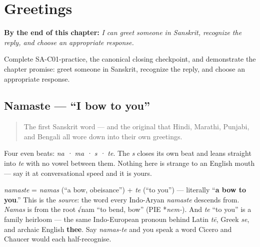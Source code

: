 
\chapter{Greetings}
\label{ch:greetings}

\begin{chapteropening}
\textbf{By the end of this chapter:} \emph{I can greet someone in Sanskrit, recognize the reply, and choose an appropriate response.}

Complete SA-C01-practice, the canonical closing checkpoint, and demonstrate the chapter promise: greet someone in Sanskrit, recognize the reply, and choose an appropriate response.
\end{chapteropening}

\section[\texorpdfstring{\sk{नमस्ते} (namaste)}{नमस्ते (namaste)}]{Namaste — \textquotedblleft{}I bow to you\textquotedblright{}}

\label{lesson:SA-C01-namaste}



\begin{quote}
The first Sanskrit word — and the original that Hindi, Marathi, Punjabi, and Bengali all wore down into their own greetings.
\end{quote}

\begin{sounds}
Four even beats: \emph{na · ma · s · te}. The \emph{s} closes its own beat and leans straight into \emph{te} with no vowel between them. Nothing here is strange to an English mouth — say it at conversational speed and it is yours.
\end{sounds}

\begin{cousinweb}
\emph{namaste} = \emph{namas} (\textquotedblleft{}a bow, obeisance\textquotedblright{}) + \emph{te} (\textquotedblleft{}to you\textquotedblright{}) — literally \textquotedblleft{}\textbf{a bow to you}.\textquotedblright{} This is the \emph{source}: the word every Indo-Aryan \emph{namaste} descends from. \emph{Namas} is from the root √nam \textquotedblleft{}to bend, bow\textquotedblright{} (PIE *\emph{nem-}). And \emph{te} \textquotedblleft{}to you\textquotedblright{} is a family heirloom — the same Indo-European pronoun behind Latin \emph{tē}, Greek \emph{se}, and archaic English \textbf{thee}. Say \emph{namas-te} and you speak a word Cicero and Chaucer would each half-recognise.
\end{cousinweb}

